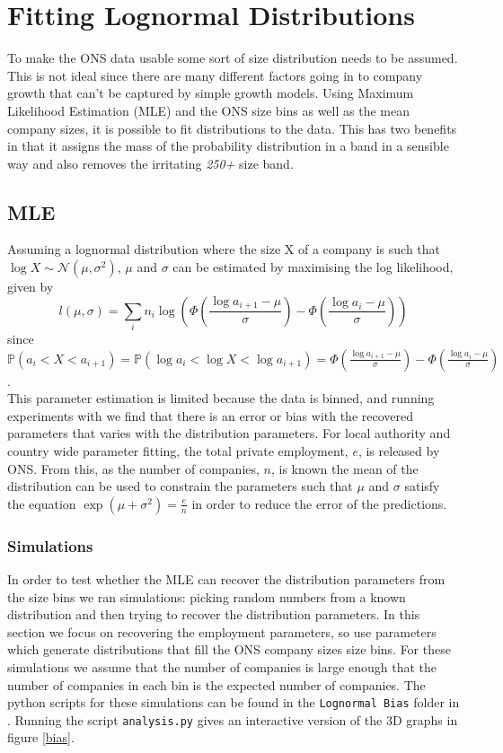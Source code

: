 \documentclass[a4paper,10pt]{article}
\begin{document}
   \section{Fitting Lognormal Distributions}
   To make the ONS data usable some sort of size distribution needs to be assumed. This is not ideal since there are many different factors going in to company growth that can't be captured by simple growth models. Using Maximum Likelihood Estimation (MLE) and the ONS size bins as well as the mean company sizes, it is possible to fit distributions to the data. This has two benefits in that it assigns the mass of the probability distribution in a band in a sensible way and also removes the irritating \emph{250+} size band.
   
   \subsection{MLE}
  
   Assuming a lognormal distribution where the size X of a company is such that $\log X \sim \mathcal{N}(\mu, \sigma^2)$, $\mu$ and $\sigma$ can be estimated by maximising the log likelihood, given by
   \begin{equation}
   l(\mu, \sigma) = \sum_i n_i \log \left( \Phi \left( \frac{\log a_{i + 1} - \mu}{\sigma} \right) - \Phi \left( \frac{\log a_{i} - \mu}{\sigma} \right) \right)
   \end{equation}
   since $\mathbb{P}(a_i < X < a_{i + 1}) = \mathbb{P}(\log a_i < \log X < \log a_{i + 1}) = \Phi \left( \frac{\log a_{i + 1} - \mu}{\sigma} \right) - \Phi \left( \frac{\log a_{i} - \mu}{\sigma} \right)$. \\
   This parameter estimation is limited because the data is binned, and running experiments with we find that there is an error or bias with the recovered parameters that varies with the distribution parameters. For local authority and country wide parameter fitting, the total private employment, $e$, is released by ONS. From this, as the number of companies, $n$, is known the mean of the distribution can be used to constrain the parameters such that $\mu$ and $\sigma$ satisfy the equation $\exp(\mu + \sigma^2) = \frac{e}{n}$ in order to reduce the error of the predictions.

   \subsubsection{Simulations}

   In order to test whether the MLE can recover the distribution parameters from the size bins we ran simulations: picking random numbers from a known distribution and then trying to recover the distribution parameters. In this section we focus on recovering the employment parameters, so use parameters which generate distributions that fill the ONS company sizes size bins. For these simulations we assume that the number of companies is large enough that the number of companies in each bin is the expected number of companies. The python scripts for these simulations can be found in the \texttt{Lognormal Bias} folder in \cite{github}. Running the script \texttt{analysis.py} gives an interactive version of the 3D graphs in figure \ref{bias}.
\end{document}
